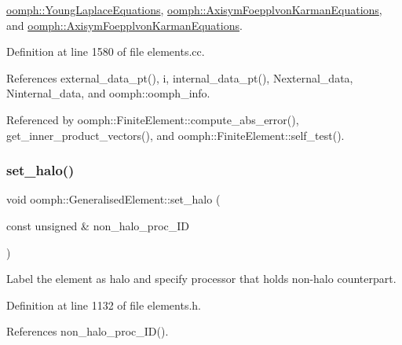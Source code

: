 \hyperlink{classoomph_1_1YoungLaplaceEquations_a5856fb3002cc7e9c860331d2c8c87c10}{oomph\+::\+Young\+Laplace\+Equations}, \hyperlink{classoomph_1_1AxisymFoepplvonKarmanEquations_a2ececacf1a7dd89188a4a20e5abbb7c0}{oomph\+::\+Axisym\+Foepplvon\+Karman\+Equations}, and \hyperlink{classoomph_1_1AxisymFoepplvonKarmanEquations_a2ececacf1a7dd89188a4a20e5abbb7c0}{oomph\+::\+Axisym\+Foepplvon\+Karman\+Equations}.



Definition at line 1580 of file elements.\+cc.



References external\+\_\+data\+\_\+pt(), i, internal\+\_\+data\+\_\+pt(), Nexternal\+\_\+data, Ninternal\+\_\+data, and oomph\+::oomph\+\_\+info.



Referenced by oomph\+::\+Finite\+Element\+::compute\+\_\+abs\+\_\+error(), get\+\_\+inner\+\_\+product\+\_\+vectors(), and oomph\+::\+Finite\+Element\+::self\+\_\+test().

\mbox{\label{classoomph_1_1GeneralisedElement_aac64aa49118c51541559c86e8572b317}} 
\subsubsection{\texorpdfstring{set\+\_\+halo()}{set\_halo()}}
{\footnotesize\ttfamily void oomph\+::\+Generalised\+Element\+::set\+\_\+halo (\begin{DoxyParamCaption}\item[{const unsigned \&}]{non\+\_\+halo\+\_\+proc\+\_\+\+ID }\end{DoxyParamCaption})\hspace{0.3cm}{\ttfamily [inline]}}



Label the element as halo and specify processor that holds non-\/halo counterpart. 



Definition at line 1132 of file elements.\+h.



References non\+\_\+halo\+\_\+proc\+\_\+\+I\+D().



